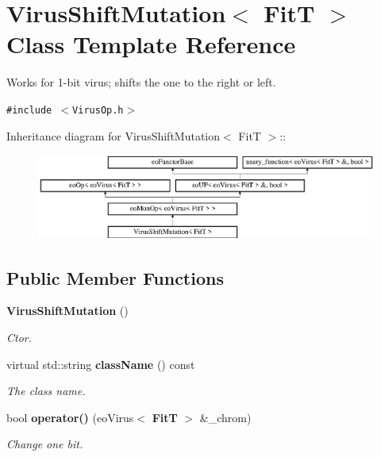 \section{Virus\-Shift\-Mutation$<$ Fit\-T $>$ Class Template Reference}
\label{class_virus_shift_mutation}
Works for 1-bit virus; shifts the one to the right or left.  


{\tt \#include $<$Virus\-Op.h$>$}

Inheritance diagram for Virus\-Shift\-Mutation$<$ Fit\-T $>$::\begin{figure}[H]
\begin{center}
\leavevmode
\includegraphics[height=2.81761cm]{class_virus_shift_mutation}
\end{center}
\end{figure}
\subsection*{Public Member Functions}
\begin{CompactItemize}
\item 
{\bf Virus\-Shift\-Mutation} ()\label{class_virus_shift_mutation_a0}

\begin{CompactList}\small\item\em Ctor. \item\end{CompactList}\item 
virtual std::string {\bf class\-Name} () const \label{class_virus_shift_mutation_a1}

\begin{CompactList}\small\item\em The class name. \item\end{CompactList}\item 
bool {\bf operator()} (eo\-Virus$<$ {\bf Fit\-T} $>$ \&\_\-chrom)
\begin{CompactList}\small\item\em Change one bit. \item\end{CompactList}\end{CompactItemize}


